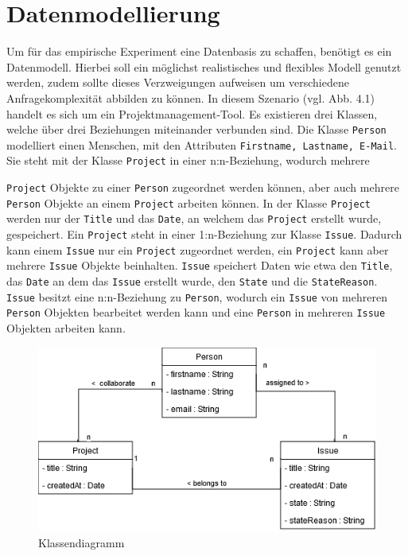 \chapter{Datenmodellierung} %
\label{sec:datamodelling}
Um für das empirische Experiment eine Datenbasis zu schaffen, benötigt es ein Datenmodell. Hierbei soll ein möglichst realistisches und flexibles Modell genutzt werden, zudem sollte dieses Verzweigungen aufweisen um verschiedene Anfragekomplexität abbilden zu können. In diesem Szenario (vgl. Abb. 4.1) handelt es sich um ein Projektmanagement-Tool. Es existieren drei Klassen, welche über drei Beziehungen miteinander verbunden sind. Die Klasse \texttt{Person} modelliert einen Menschen, mit den Attributen \texttt{Firstname, Lastname, E-Mail}. Sie steht mit der Klasse \texttt{Project} in einer n:n-Beziehung, wodurch mehrere 

\noindent
\texttt{Project} Objekte zu einer \texttt{Person} zugeordnet werden können, aber auch mehrere \texttt{Person} Objekte an einem \texttt{Project} arbeiten können. In der Klasse \texttt{Project} werden nur der \texttt{Title} und das \texttt{Date}, an welchem das \texttt{Project} erstellt wurde, gespeichert. Ein \texttt{Project} steht in einer 1:n-Beziehung zur Klasse \texttt{Issue}. Dadurch kann einem \texttt{Issue} nur ein \texttt{Project} zugeordnet werden, ein \texttt{Project} kann aber mehrere \texttt{Issue} Objekte beinhalten. \texttt{Issue} speichert Daten wie etwa den \texttt{Title}, das \texttt{Date} an dem das \texttt{Issue} erstellt wurde, den \texttt{State} und die \texttt{StateReason}. \texttt{Issue} besitzt eine n:n-Beziehung zu \texttt{Person}, wodurch ein \texttt{Issue} von mehreren \texttt{Person} Objekten bearbeitet werden kann und eine \texttt{Person} in mehreren \texttt{Issue} Objekten arbeiten kann.
\vspace{1cm}
\label{sec:datenmodell}
\begin{figure}[h!]
	\centering
	\includegraphics[scale=.8]{Illustrations/class_diagram.png}
	\caption{Klassendiagramm}
\end{figure}



